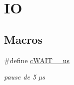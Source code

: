 \hypertarget{group___i_o}{\section{I\-O}
\label{group___i_o}
}
\subsection*{Macros}
\begin{DoxyCompactItemize}
\item 
\#define \hyperlink{group___i_o_gad8d73a31b3d7e5ed74e525e198cc78f3}{c\-W\-A\-I\-T\-\_\-\_\-us}
\begin{DoxyCompactList}\small\item\em pause de 5 µs \end{DoxyCompactList}\end{DoxyCompactItemize}
